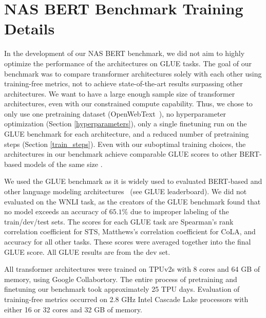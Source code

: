 \documentclass[11pt]{article}
\begin{document}
\section{NAS BERT Benchmark Training Details}
    In the development of our NAS BERT benchmark, we did not aim to highly optimize the performance of the architectures on GLUE tasks. The goal of our benchmark was to compare transformer architectures solely with each other using training-free metrics, not to achieve state-of-the-art results surpassing other architectures. We want to have a large enough sample size of transformer architectures, even with our constrained compute capability. Thus, we chose to only use one pretraining dataset (OpenWebText~\cite{gokaslan_openwebtext_2019}), no hyperparameter optimization (Section \ref{hyperparameters}), only a single finetuning run on the GLUE benchmark for each architecture, and a reduced number of pretraining steps (Section \ref{train_steps}). Even with our suboptimal training choices, the architectures in our benchmark achieve comparable GLUE scores to other BERT-based models of the same size \cite{tuli_flexibert_2022, turc_well-read_2019}.

    We used the GLUE benchmark as it is widely used to evaluated BERT-based and other language modeling architectures~\cite{wang_glue_2019} (see GLUE leaderboard). We did not evaluated on the WNLI task, as the creators of the GLUE benchmark found that no model exceeds an accuracy of $65.1\%$ due to improper labeling of the train/dev/test sets. The scores for each GLUE task are Spearman's rank correlation coefficient for STS, Matthews's correlation coefficient for CoLA, and accuracy for all other tasks. These scores were averaged together into the final GLUE score. All GLUE results are from the dev set.

    All transformer architectures were trained on TPUv2s with 8 cores and 64 GB of memory, using Google Collabortory. The entire process of pretraining and finetuning our benchmark took approximately 25 TPU days. Evaluation of training-free metrics occurred on 2.8 GHz Intel Cascade Lake processors with either 16 or 32 cores and 32 GB of memory.
\end{document}

